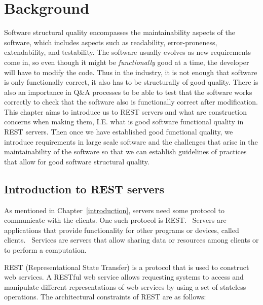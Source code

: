 \chapter{Background}\label{background}

Software structural quality encompasses the maintainability aspects of the
software, which includes aspects such as readability, error-proneness,
extendability, and testability. The software usually evolves as new requirements
come in, so even though it might be \textit{functionally} good at a time, the
developer will have to modify the code. Thus in the industry, it is not enough
that software is only functionally correct, it also has to be structurally of
good quality. There is also an importance in Q\&A processes to be able to test
that the software works correctly to check that the software also is
functionally correct after modification. This chapter aims to introduce us to
REST servers and what are construction concerns when making them, I.E. what is
good software functional quality in REST servers. Then once we have established
good functional quality, we introduce requirements in large scale software and
the challenges that arise in the maintainability of the software so that we can
establish guidelines of practices that allow for good software structural
quality.

\section{Introduction to REST servers}

As mentioned in Chapter~\ref{introduction}, servers need some protocol to
communicate with the clients. One such protocol is
REST.~\cite{Fielding:2000:ASD:932295} Servers are applications that provide
functionality for other programs or devices, called
clients.~\cite{Fielding:2000:ASD:932295} Services are servers that allow sharing
data or resources among clients or to perform a computation.

REST (Representational State Transfer) is a protocol that is used to construct
web services. A RESTful web service allows requesting systems to access
and manipulate different representations of web services by using a set of
stateless operations. The architectural constraints of REST are as follows:

